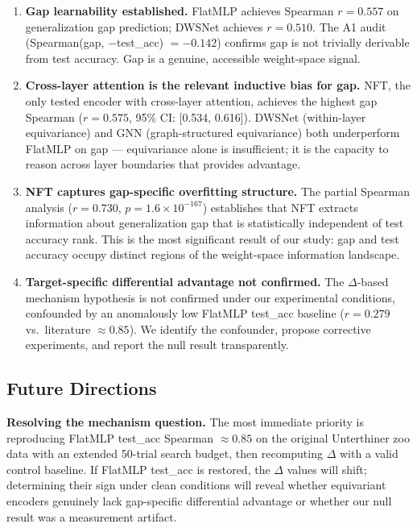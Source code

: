 \begin{enumerate}
\item \textbf{Gap learnability established.} FlatMLP achieves Spearman $r = 0.557$ on generalization gap
   prediction; DWSNet achieves $r = 0.510$. The A1 audit (Spearman(gap, $-$test\_acc) $= -0.142$) confirms
   gap is not trivially derivable from test accuracy. Gap is a genuine, accessible weight-space signal.

\item \textbf{Cross-layer attention is the relevant inductive bias for gap.} NFT, the only tested encoder with
   cross-layer attention, achieves the highest gap Spearman ($r = 0.575$, 95\% CI: [0.534, 0.616]).
   DWSNet (within-layer equivariance) and GNN (graph-structured equivariance) both underperform
   FlatMLP on gap --- equivariance alone is insufficient; it is the capacity to reason across layer
   boundaries that provides advantage.

\item \textbf{NFT captures gap-specific overfitting structure.} The partial Spearman analysis ($r = 0.730$,
   $p = 1.6 \times 10^{-167}$) establishes that NFT extracts information about generalization gap that is
   statistically independent of test accuracy rank. This is the most significant result of our study:
   gap and test accuracy occupy distinct regions of the weight-space information landscape.

\item \textbf{Target-specific differential advantage not confirmed.} The $\Delta$-based mechanism hypothesis is
   not confirmed under our experimental conditions, confounded by an anomalously low FlatMLP test\_acc
   baseline ($r = 0.279$ vs.\ literature $\approx 0.85$). We identify the confounder, propose corrective
   experiments, and report the null result transparently.
\end{enumerate}

\subsection*{Future Directions}

\textbf{Resolving the mechanism question.} The most immediate priority is reproducing FlatMLP test\_acc
Spearman $\approx 0.85$ on the original Unterthiner zoo data with an extended 50-trial search budget, then
recomputing $\Delta$ with a valid control baseline. If FlatMLP test\_acc is restored, the $\Delta$ values will shift;
determining their sign under clean conditions will reveal whether equivariant encoders genuinely lack
gap-specific differential advantage or whether our null result was a measurement artifact.

